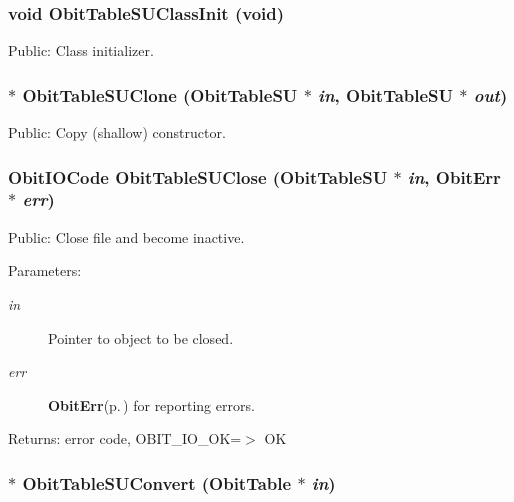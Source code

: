 \subsubsection{\setlength{\rightskip}{0pt plus 5cm}void Obit\-Table\-SUClass\-Init (void)}\label{ObitTableSU_8h_a10}


Public: Class initializer. 

\subsubsection{$\ast$ Obit\-Table\-SUClone ({\bf Obit\-Table\-SU} $\ast$ {\em in}, {\bf Obit\-Table\-SU} $\ast$ {\em out})}\label{ObitTableSU_8h_a15}


Public: Copy (shallow) constructor. 

\subsubsection{\setlength{\rightskip}{0pt plus 5cm}Obit\-IOCode Obit\-Table\-SUClose ({\bf Obit\-Table\-SU} $\ast$ {\em in}, {\bf Obit\-Err} $\ast$ {\em err})}\label{ObitTableSU_8h_a21}


Public: Close file and become inactive. 

\begin{Desc}
\item[Parameters:]
\begin{description}
\item[{\em in}]Pointer to object to be closed. \item[{\em err}]{\bf Obit\-Err}{\rm (p.\,\pageref{structObitErr})} for reporting errors. \end{description}
\end{Desc}
\begin{Desc}
\item[Returns:]error code, OBIT\_\-IO\_\-OK=$>$ OK \end{Desc}
\subsubsection{$\ast$ Obit\-Table\-SUConvert ({\bf Obit\-Table} $\ast$ {\em in})}\label{ObitTableSU_8h_a16}


